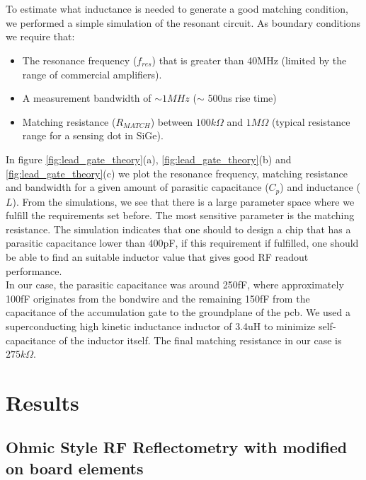 \documentclass{article}
\begin{document}
	\\ \\
	To estimate what inductance is needed to generate a good matching condition, we performed a simple simulation of the resonant circuit. As boundary conditions we require that:
	\begin{itemize}
		\item The resonance frequency ($f_{res}$) that is greater than 40MHz (limited by the range of commercial amplifiers).
		\item A measurement bandwidth of $\sim 1MHz$ ($\sim$ 500ns rise time)
		\item Matching resistance ($R_{MATCH}$) between $100k\Omega$ and $1M\Omega$ (typical resistance range for a sensing dot in SiGe).
	\end{itemize}
	 In figure \ref{fig:lead_gate_theory}(a),  \ref{fig:lead_gate_theory}(b) and \ref{fig:lead_gate_theory}(c) we plot the resonance frequency, matching resistance and bandwidth for a given amount of parasitic capacitance ($C_p$) and inductance ($L$).
	 From the simulations, we see that there is a large parameter space where we fulfill the requirements set before. The most sensitive parameter is the matching resistance. The simulation indicates that one should to design a chip that has a parasitic capacitance lower than 400pF, if this requirement if fulfilled, one should be able to find an suitable inductor value that gives good RF readout performance.\\
	 In our case, the parasitic capacitance was around 250fF, where approximately 100fF originates from the bondwire and the remaining 150fF from the capacitance of the accumulation gate to the groundplane of the pcb. We used a superconducting high kinetic inductance inductor of 3.4uH to minimize self-capacitance of the inductor itself. The final matching resistance in our case is $275k\Omega$.  

\section{Results} %
\label{sec:results}
\subsection{Ohmic Style RF Reflectometry with modified on board elements} %
	\label{sub:ohmic_style_rf_reflectometry_with_modified_on_board_elements}
\end{document}
